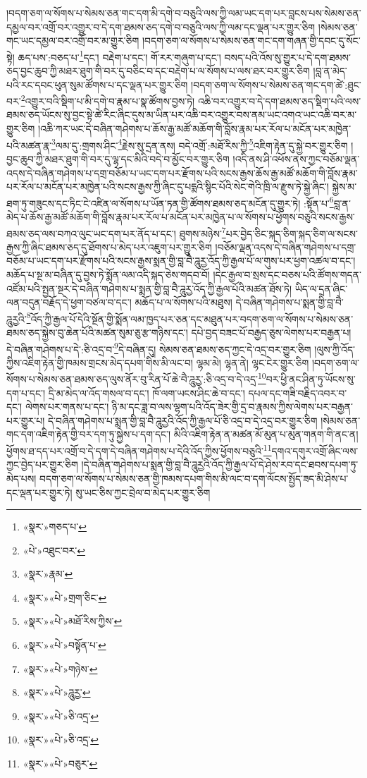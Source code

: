 །བདག་ཅག་ལ་སོགས་པ་སེམས་ཅན་གང་དག་མི་དགེ་བ་བཅུའི་ལས་ཀྱི་ལམ་ཡང་དག་པར་བླངས་པས་སེམས་ཅན་དམྱལ་བར་འགྲོ་བར་འགྱུར་བ་དེ་དག་ཐམས་ཅད་དགེ་བ་བཅུའི་ལས་ཀྱི་ལམ་དང་ལྡན་པར་གྱུར་ཅིག །སེམས་ཅན་གང་ཡང་དམྱལ་བར་འགྲོ་བར་མ་གྱུར་ཅིག །བདག་ཅག་ལ་སོགས་པ་སེམས་ཅན་གང་དག་གཞན་གྱི་དབང་དུ་སོང་སྟེ། ཆད་པས་:བཅད་པ་\footnote{«སྣར་»གཅད་པ་}དང་། བརྡེག་པ་དང་། གོ་རར་གཞུག་པ་དང་། བསད་པའི་འོས་སུ་གྱུར་པ་དེ་དག་ཐམས་ཅད་བྱང་ཆུབ་ཀྱི་མཐར་ཐུག་གི་བར་དུ་བཅིང་བ་དང་བརྡེག་པ་ལ་སོགས་པ་ལས་ཐར་བར་གྱུར་ཅིག །བླ་ན་མེད་པའི་རང་དབང་ཕུན་སུམ་ཚོགས་པ་དང་ལྡན་པར་གྱུར་ཅིག །བདག་ཅག་ལ་སོགས་པ་སེམས་ཅན་གང་དག་ཚེ་:ཐུང་བར་\footnote{«པེ་»འཐུང་བར་}འགྱུར་བའི་སྡིག་པ་མི་དགེ་བ་རྣམ་པ་སྣ་ཚོགས་བྱས་ཏེ། འཆི་བར་འགྱུར་བ་དེ་དག་ཐམས་ཅད་སྡིག་པའི་ལས་ཐམས་ཅད་ཡོངས་སུ་བྱང་སྟེ་ཚེ་རིང་ཞིང་དུས་མ་ཡིན་པར་འཆི་བར་འགྱུར་བས་ནམ་ཡང་འགའ་ཡང་འཆི་བར་མ་གྱུར་ཅིག །འཆི་ཀར་ཡང་དེ་བཞིན་གཤེགས་པ་ཆོས་རྒྱ་མཚོ་མཆོག་གི་བློས་རྣམ་པར་རོལ་པ་མངོན་པར་མཁྱེན་པའི་མཚན་རྣ་\footnote{«སྣར་»རྣམ་}ལམ་དུ་:གྲགས་ཤིང་\footnote{«སྣར་»«པེ་»གྲག་ཅིང་}རྗེས་སུ་དྲན་ནས། བདེ་འགྲོ་:མཐོ་རིས་ཀྱི་\footnote{«སྣར་»«པེ་»མཐོ་རིས་ཀྱིས་}འཇིག་རྟེན་དུ་སྐྱེ་བར་གྱུར་ཅིག །བྱང་ཆུབ་ཀྱི་མཐར་ཐུག་གི་བར་དུ་ལྷ་དང་མིའི་བདེ་བ་མྱོང་བར་གྱུར་ཅིག །འདི་ནས་ཤི་འཕོས་ནས་ཀྱང་བཅོམ་ལྡན་འདས་དེ་བཞིན་གཤེགས་པ་དགྲ་བཅོམ་པ་ཡང་དག་པར་རྫོགས་པའི་སངས་རྒྱས་ཆོས་རྒྱ་མཚོ་མཆོག་གི་བློས་རྣམ་པར་རོལ་པ་མངོན་པར་མཁྱེན་པའི་སངས་རྒྱས་ཀྱི་ཞིང་དུ་པདྨའི་སྙིང་པོའི་སེང་གེའི་ཁྲི་ལ་རྫུས་ཏེ་སྐྱེ་ཞིང་། སྐྱེས་མ་ཐག་ཏུ་གཟུངས་དང་ཏིང་ངེ་འཛིན་ལ་སོགས་པ་ཡོན་ཏན་གྱི་ཚོགས་ཐམས་ཅད་མངོན་དུ་གྱུར་ཏེ། :སྟོན་པ་\footnote{«སྣར་»«པེ་»བསྟོན་པ་}བླ་ན་མེད་པ་ཆོས་རྒྱ་མཚོ་མཆོག་གི་བློས་རྣམ་པར་རོལ་པ་མངོན་པར་མཁྱེན་པ་ལ་སོགས་པ་ཕྱོགས་བཅུའི་སངས་རྒྱས་ཐམས་ཅད་ལས་བཀའ་ལུང་ཡང་དག་པར་ནོད་པ་དང་། ཐུགས་མཉེས་\footnote{«སྣར་»«པེ་»གཉེས་}པར་བྱེད་ཅིང་སྐད་ཅིག་སྐད་ཅིག་ལ་སངས་རྒྱས་ཀྱི་ཞིང་ཐམས་ཅད་དུ་ཐོགས་པ་མེད་པར་འཇུག་པར་གྱུར་ཅིག །བཅོམ་ལྡན་འདས་དེ་བཞིན་གཤེགས་པ་དགྲ་བཅོམ་པ་ཡང་དག་པར་རྫོགས་པའི་སངས་རྒྱས་སྨན་གྱི་བླ་བཻ་ཌཱུརྱ་འོད་ཀྱི་རྒྱལ་པོ་ལ་གུས་པར་ཕྱག་འཚལ་བ་དང་། མཆོད་པ་སྔ་མ་བཞིན་དུ་བྱས་ཏེ་སྨོན་ལམ་འདི་སྐད་ཅེས་གདབ་བོ། །དེང་རྒྱལ་བ་སྲས་དང་བཅས་པའི་ཚོགས་གདན་འཛོམ་པའི་སྤྱན་སྔར་དེ་བཞིན་གཤེགས་པ་སྨན་གྱི་བླ་བཻ་ཌཱུརྱ་འོད་ཀྱི་རྒྱལ་པོའི་མཚན་ཐོས་ཏེ། ཡིད་ལ་དྲན་ཞིང་ལན་བདུན་བརྗོད་དེ་ཕྱག་བཙལ་བ་དང་། མཆོད་པ་ལ་སོགས་པའི་མཐུས། དེ་བཞིན་གཤེགས་པ་སྨན་གྱི་བླ་བཻ་ཌཱུརྱའི་\footnote{«སྣར་»«པེ་»ཌཱུརྱ་}འོད་ཀྱི་རྒྱལ་པོ་དེའི་སྔོན་གྱི་སྨོན་ལམ་ཁྱད་པར་ཅན་དང་མཐུན་པར་བདག་ཅག་ལ་སོགས་པ་སེམས་ཅན་ཐམས་ཅད་སྐྱེས་བུ་ཆེན་པོའི་མཚན་སུམ་ཅུ་རྩ་གཉིས་དང་། དཔེ་བྱད་བཟང་པོ་བརྒྱད་ཅུས་ལེགས་པར་བརྒྱན་པ། དེ་བཞིན་གཤེགས་པ་དེ་:ཅི་འདྲ་བ་\footnote{«སྣར་»«པེ་»ཅི་འདྲ་}དེ་བཞིན་དུ། སེམས་ཅན་ཐམས་ཅད་ཀྱང་དེ་འདྲ་བར་གྱུར་ཅིག །ལུས་ཀྱི་འོད་ཀྱིས་འཇིག་རྟེན་གྱི་ཁམས་གྲངས་མེད་དཔག་གིས་མི་ལང་བ། ལྷམ་མེ། ལྷན་ནེ། ལྷང་ངེར་གྱུར་ཅིག །བདག་ཅག་ལ་སོགས་པ་སེམས་ཅན་ཐམས་ཅད་ལུས་ནོར་བུ་རིན་པོ་ཆེ་བཻ་ཌཱུརྱ་:ཅི་འདྲ་བ་དེ་འདྲ་\footnote{«སྣར་»«པེ་»ཅི་འདྲ་}བར་ཕྱི་ནང་ཤིན་ཏུ་ཡོངས་སུ་དག་པ་དང་། དྲི་མ་མེད་ལ་འོད་གསལ་བ་དང་། ཁོ་ལག་ཡངས་ཤིང་ཆེ་བ་དང་། དཔལ་དང་གཟི་བརྗིད་འབར་བ་དང་། ལེགས་པར་གནས་པ་དང་། ཉི་མ་དང་ཟླ་བ་ལས་ལྷག་པའི་འོད་ཟེར་གྱི་དྲ་བ་རྣམས་ཀྱིས་ལེགས་པར་བརྒྱན་པར་གྱུར་པ། དེ་བཞིན་གཤེགས་པ་སྨན་གྱི་བླ་བཻ་ཌཱུརྱའི་འོད་ཀྱི་རྒྱལ་པོ་ཅི་འདྲ་བ་དེ་འདྲ་བར་གྱུར་ཅིག །སེམས་ཅན་གང་དག་འཇིག་རྟེན་གྱི་བར་དག་ཏུ་སྐྱེས་པ་དག་དང་། མིའི་འཇིག་རྟེན་ན་མཚན་མོ་མུན་པ་མུན་གནག་གི་ནང་ན། ཕྱོགས་ཐ་དད་པར་འགྲོ་བ་དེ་དག་དེ་བཞིན་གཤེགས་པ་དེའི་འོད་ཀྱིས་ཕྱོགས་བཅུའི་\footnote{«སྣར་»«པེ་»བཅུར་}དགའ་དགུར་འགྲོ་ཞིང་ལས་ཀྱང་བྱེད་པར་གྱུར་ཅིག །དེ་བཞིན་གཤེགས་པ་སྨན་གྱི་བླ་བཻ་ཌཱུརྱའི་འོད་ཀྱི་རྒྱལ་པོ་དེ་ཤེས་རབ་དང་ཐབས་དཔག་ཏུ་མེད་པས། བདག་ཅག་ལ་སོགས་པ་སེམས་ཅན་གྱི་ཁམས་དཔག་གིས་མི་ལང་བ་དག་ལོངས་སྤྱོད་ཟད་མི་ཤེས་པ་དང་ལྡན་པར་གྱུར་ཏེ། སུ་ཡང་ཅིས་ཀྱང་བྲེལ་བ་མེད་པར་གྱུར་ཅིག 